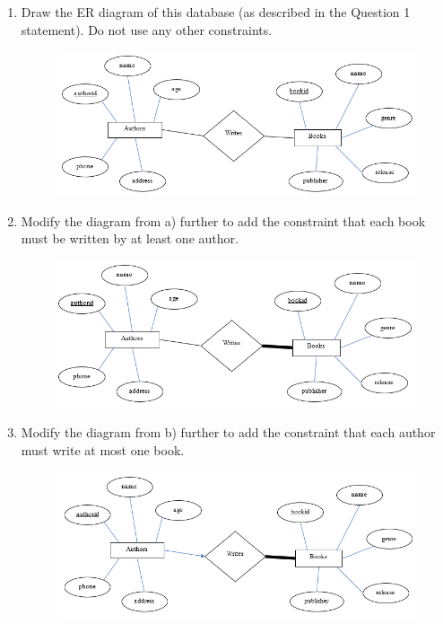 \documentclass[letterpaper, 11pt]{article}
\begin{document}
\begin{enumerate}[label={\alph*})]
    \item Draw the ER diagram of this database (as described in the Question 1 statement). Do not use any other constraints.
    \begin{figure}[H]
        \centering
        \includegraphics[scale=0.7]{hw2-1a.png}
    \end{figure}
    \item Modify the diagram from a) further to add the constraint that each book must be written by at least one author.
    \begin{figure}[H]
        \centering
        \includegraphics[scale=0.7]{hw2-1b.png}
    \end{figure}
    \item Modify the diagram from b) further to add the constraint that each author must write at most one book.
    \begin{figure}[H]
        \centering
        \includegraphics[scale=0.7]{hw2-1c.png}

\end{figure}
\end{enumerate}
\end{document}

